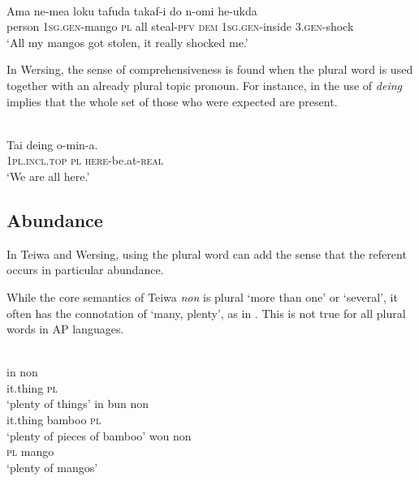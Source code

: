 \ea%
\label{ex:9:71}
 \\
\gll  Ama {\ob}ne-mea loku{\cb} tafuda takaf-i  do n-omi he-ukda \\
    person \textsc{1sg.gen-}mango \textsc{pl} all steal-\textsc{pfv}  \textsc{dem} \textsc{1sg.gen-}inside 3.\textsc{gen-}shock \\
\glt `All my mangos got stolen,  it really shocked me.' %
\z












In Wersing, the sense of comprehensiveness is found when the plural word is used together with an already plural topic pronoun. For instance, in  the use of \textit{deing} implies that the whole set of those who were expected are present.


\ea%
\label{ex:9:72}
 \\
\gll Tai deing o-min-a.  \\
   \textsc{1pl.incl.top} \textsc{pl}   \textsc{here}-be.at-\textsc{real}  \\
\glt `We are all here.'
\z






\subsection{Abundance} %
\label{sec:9:4.2}
In Teiwa and Wersing, using the plural word can add the sense that the referent occurs in particular abundance.

While the core semantics of Teiwa \textit{non} is plural `more than one' or `several', it often has the connotation of `many, plenty', as in . This is not true for all plural words in AP languages.


\ea%
\label{ex:9:73}
 \\
\ea
\gll  in  non\\
   it.thing  \textsc{pl} \\
   \glt `plenty of things' 
\ex
\gll in  bun non \\
it.thing bamboo \textsc{pl} \\
\glt `plenty of pieces of bamboo'
\ex 
\gll wou  non\\
\textsc{pl} mango\\
\glt  `plenty of mangos'
\z
\z

